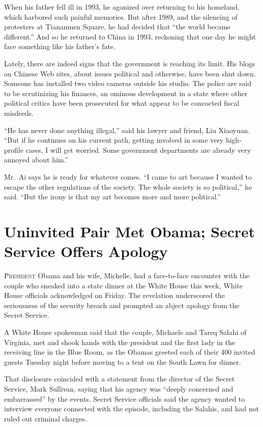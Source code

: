 ﻿\documentclass[12pt]{article}
\begin{document}
When his father fell ill in 1993, he agonized over returning to his homeland, which harbored such
painful memories. But after 1989, and the silencing of protesters at Tiananmen Square, he had
decided that ``the world became different.'' And so he returned to China in 1993, reckoning that one
day he might face something like his father's fate.

Lately, there are indeed signs that the government is reaching its limit. His blogs on Chinese Web
sites, about issues political and otherwise, have been shut down. Someone has installed two video
cameras outside his studio. The police are said to be scrutinizing his finances, an ominous
development in a state where other political critics have been prosecuted for what appear to be
concocted fiscal misdeeds.

``He has never done anything illegal,'' said his lawyer and friend, Liu Xiaoyuan. ``But if he
continues on his current path, getting involved in some very high-profile cases, I will get worried.
Some government departments are already very annoyed about him.''

Mr.~Ai says he is ready for whatever comes. ``I came to art because I wanted to escape the other
regulations of the society. The whole society is so political,'' he said. ``But the irony is that my
art becomes more and more political.''

\section{Uninvited Pair Met Obama; Secret Service Offers Apology}

\lettrine{P}{resident} Obama and his wife, Michelle, had a face-to-face
encounter with the couple who sneaked into a state dinner at the White House this week, White House
officials acknowledged on Friday. The revelation underscored the seriousness of the security breach
and prompted an abject apology from the Secret Service.

A White House spokesman said that the couple, Michaele and Tareq Salahi of Virginia, met and shook
hands with the president and the first lady in the receiving line in the Blue Room, as the Obamas
greeted each of their 400 invited guests Tuesday night before moving to a tent on the South Lawn for
dinner.

That disclosure coincided with a statement from the director of the Secret Service, Mark Sullivan,
saying that his agency was ``deeply concerned and embarrassed'' by the events. Secret Service
officials said the agency wanted to interview everyone connected with the episode, including the
Salahis, and had not ruled out criminal charges.
\end{document}
